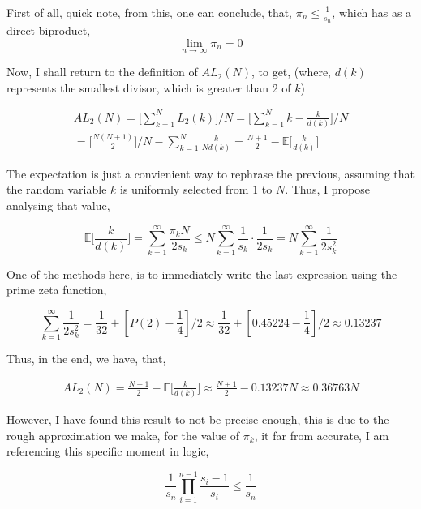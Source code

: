 \documentclass{article}
\begin{document}
First of all, quick note, from this, one can conclude, that, $\pi_n \leq \frac{1}{s_n}$, which has as a direct biproduct,
\begin{equation}
	\lim_{n \rightarrow \infty} \pi_n = 0
\end{equation}

Now, I shall return to the definition of \(AL_2(N)\), to get, (where, \(d(k)\) represents the smallest divisor, which is greater than 2 of \(k\))

\begin{multline}
	AL_2(N) = \biggl[ \sum_{k = 1}^N L_2(k) \biggr] / N =  \biggl[ \sum_{k = 1}^N k - \frac{k}{d(k)} \biggr] / N 
	\\ = \biggl[ \frac{N(N + 1)}{2} \biggr] / N - \sum_{k = 1}^N \frac{k}{N d(k)} = \frac{N + 1}{2} - \mathbb{E} \biggl[ \frac{k}{d(k)} \biggr]
\end{multline}

The expectation is just a convienient way to rephrase the previous, assuming that the random variable \(k\) is uniformly selected from \(1\) to \(N\). Thus, I propose analysing that value,

\begin{equation}
	\mathbb{E} \biggl[ \frac{k}{d(k)} \biggr] = \sum_{k = 1}^{\infty} \frac{\pi_k N}{2 s_k} \leq N \sum_{k = 1}^{\infty} \frac{1}{s_k} \cdot \frac{1}{2 s_k} = N \sum_{k = 1}^{\infty} \frac{1}{2 s_k^2}
\end{equation}

One of the methods here, is to immediately write the last expression using the prime zeta function,

\begin{equation}
	\sum_{k = 1}^{\infty} \frac{1}{2 s_k^2} = \frac{1}{32} + \left[ P(2) - \frac{1}{4} \right] / 2 \approx \frac{1}{32} + \left[ 0.45224 - \frac{1}{4} \right] / 2 \approx 0.13237
\end{equation}

Thus, in the end, we have, that,

\begin{multline}
	AL_2(N) = \frac{N + 1}{2} - \mathbb{E} \biggl[ \frac{k}{d(k)} \biggr] \approx \frac{N + 1}{2} - 0.13237 N \approx 0.36763 N
\end{multline}

However, I have found this result to not be precise enough, this is due to the rough approximation we make, for the value of \(\pi_k\), it far from accurate, I am referencing this specific moment in logic,

\begin{equation}
	\frac{1}{s_n} \prod_{i = 1}^{n - 1} \frac{s_i - 1}{s_i} \leq \frac{1}{s_n}
\end{equation}
\end{document}
